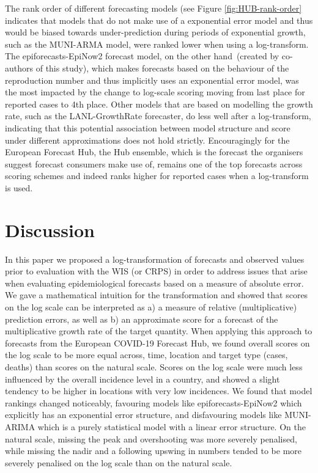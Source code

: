 \documentclass{article}
\begin{document}
The rank order of different forecasting models (see Figure \ref{fig:HUB-rank-order} indicates that models that do not make use of a exponential error model and thus would be biased towards under-prediction during periods of exponential growth, such as the MUNI-ARMA model, were ranked lower when using a log-transform. The epiforecasts-EpiNow2 forecast model, on the other hand~(created by co-authors of this study), which makes forecasts based on the behaviour of the reproduction number and thus implicitly uses an exponential error model, was the most impacted by the change to log-scale scoring moving from last place for reported cases to 4th place. Other models that are based on modelling the growth rate, such as the LANL-GrowthRate forecaster, do less well after a log-transform, indicating that this potential association between model structure and score under different approximations does not hold strictly. Encouragingly for the European Forecast Hub, the Hub ensemble, which is the forecast the organisers suggest forecast consumers make use of, remains one of the top forecasts across scoring schemes and indeed ranks higher for reported cases when a log-transform is used.




\section{Discussion}
\label{sec:discussion}

In this paper we proposed a log-transformation of forecasts and observed values prior to evaluation with the WIS (or CRPS) in order to address issues that arise when evaluating epidemiological forecasts based on a measure of absolute error. We gave a mathematical intuition for the transformation and showed that scores on the log scale can be interpreted as a) a measure of relative (multiplicative) prediction errors, as well as b) an approximate score for a forecast of the multiplicative growth rate of the target quantity. 
When applying this approach to forecasts from the European COVID-19 Forecast Hub, we found overall scores on the log scale to be more equal across, time, location and target type (cases, deaths) than scores on the natural scale. Scores on the log scale were much less influenced by the overall incidence level in a country, and showed a slight tendency to be higher in locations with very low incidences. We found that model rankings changed noticeably, favouring models like epiforecasts-EpiNow2 which explicitly has an exponential error structure, and disfavouring models like MUNI-ARIMA which is a purely statistical model with a linear error structure. On the natural scale, missing the peak and overshooting was more severely penalised, while missing the nadir and a following upswing in numbers tended to be more severely penalised on the log scale than on the natural scale. 
\end{document}
